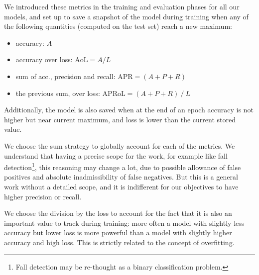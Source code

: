 We introduced these metrics in the training and evaluation phases for all our models, and set up to save a snapshot of the model during training when any of the following quantities (computed on the test set) reach a new maximum:
\begin{itemize}
    \item accuracy: $A$
    \item accuracy over loss: $\mathrm{AoL} = A/L$
    \item sum of acc., precision and recall: $\mathrm{APR} = (A+P+R)$
    \item the previous sum, over loss: $\mathrm{APRoL} = (A+P+R)\ /\ L$
\end{itemize}
Additionally, the model is also saved when at the end of an epoch accuracy is not higher but near current maximum, and loss is lower than the current stored value.

We choose the sum strategy to globally account for each of the metrics.
We understand that having a precise scope for the work, for example like fall detection\footnote{Fall detection may be re-thought as a binary classification problem.}, this reasoning may change a lot, due to possible allowance of false positives and absolute inadmissibility of false negatives.
But this is a general work without a detailed scope, and it is indifferent for our objectives to have higher precision or recall.

We choose the division by the loss to account for the fact that it is also an important value to track during training: more often a model with slightly less accuracy but lower loss is more powerful than a model with slightly higher accuracy and high loss.
This is strictly related to the concept of overfitting.
